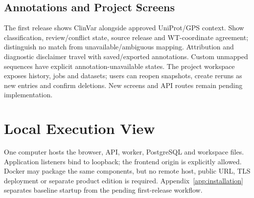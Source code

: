 \subsection{Annotations and Project Screens}
The first release shows ClinVar alongside approved UniProt/GPS context. Show classification,
review/conflict state, source release and WT-coordinate agreement; distinguish no match from
unavailable/ambiguous mapping. Attribution and diagnostic disclaimer travel with saved/exported
annotations. Custom unmapped sequences have explicit annotation-unavailable states.
The project workspace exposes history, jobs and datasets; users can reopen snapshots, create reruns
as new entries and confirm deletions. New screens and API routes remain pending implementation.

\section{Local Execution View}
One computer hosts the browser, API, worker, PostgreSQL and workspace files. Application listeners
bind to loopback; the frontend origin is explicitly allowed. Docker may package the same components,
but no remote host, public URL, TLS deployment or separate product edition is required.
Appendix~\ref{app:installation} separates baseline startup from the pending first-release workflow.
